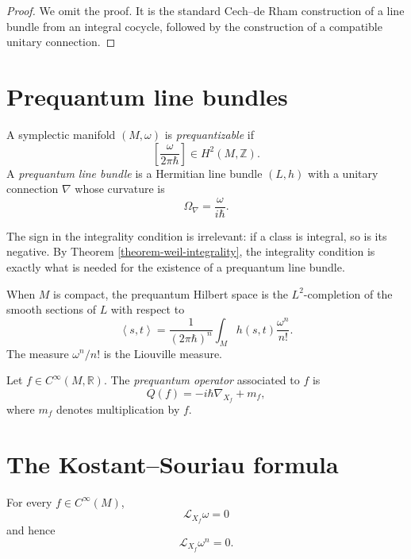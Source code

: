 \begin{proof}
We omit the proof.  It is the standard
Cech--de Rham construction of a line bundle
from an integral cocycle, followed by the
construction of a compatible unitary
connection.
\end{proof}

\section{Prequantum line bundles}
\label{section-prequantum-line-bundles}

\begin{definition}
\label{definition-prequantizable}
A symplectic manifold $(M,\omega)$ is
{\it prequantizable} if
$$
\left[\frac{\omega}{2\pi\hbar}\right]
\in H^2(M,\mathbb Z).
$$
A {\it prequantum line bundle} is a
Hermitian line bundle $(L,h)$ with a unitary
connection $\nabla$ whose curvature is
$$
\Omega_\nabla=\frac{\omega}{i\hbar}.
$$
\end{definition}

\noindent
The sign in the integrality condition is
irrelevant: if a class is integral, so is its
negative.  By Theorem
\ref{theorem-weil-integrality}, the
integrality condition is exactly what is
needed for the existence of a prequantum line
bundle.

\medskip\noindent
When $M$ is compact, the prequantum Hilbert
space is the $L^2$-completion of the smooth
sections of $L$ with respect to
$$
\left\langle{} s,t\right\rangle{}
=
\frac{1}{(2\pi\hbar)^n}
\int_M h(s,t)\frac{\omega^n}{n!}.
$$
The measure $\omega^n/n!$ is the Liouville
measure.

\begin{definition}
\label{definition-prequantum-operator}
Let $f\in C^{\infty}(M,\mathbb R)$.
The {\it prequantum operator} associated to
$f$ is
$$
Q(f)=-i\hbar\nabla_{X_f}+m_f,
$$
where $m_f$ denotes multiplication by $f$.
\end{definition}

\section{The Kostant--Souriau formula}
\label{section-kostant-souriau-formula}

\begin{lemma}
\label{lemma-hamiltonian-volume-preserving}
For every $f\in C^{\infty}(M)$,
$$
\mathcal L_{X_f}\omega=0
$$
and hence
$$
\mathcal L_{X_f}\omega^n=0.
$$
\end{lemma}

